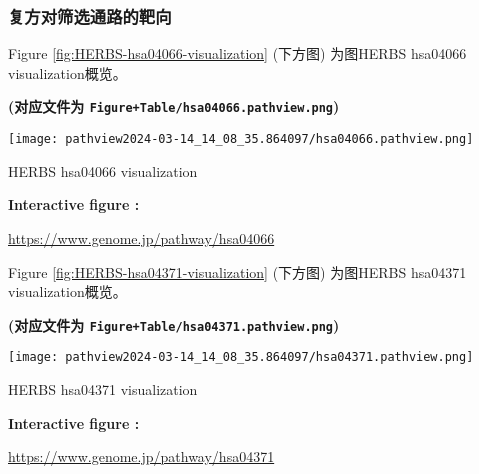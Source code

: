 \documentclass[
]{article}
\begin{document}
\hypertarget{he-t}{%
\subsubsection{复方对筛选通路的靶向}\label{he-t}}

Figure \ref{fig:HERBS-hsa04066-visualization} (下方图) 为图HERBS hsa04066 visualization概览。

\textbf{(对应文件为 \texttt{Figure+Table/hsa04066.pathview.png})}

\def\@captype{figure}
\begin{center}
\texttt{[image: pathview2024-03-14\_14\_08\_35.864097/hsa04066.pathview.png]}
\caption{HERBS hsa04066 visualization}\label{fig:HERBS-hsa04066-visualization}
\end{center}
\begin{center}\begin{tcolorbox}[colback=gray!10, colframe=gray!50, width=0.9\linewidth, arc=1mm, boxrule=0.5pt]
\textbf{
Interactive figure
:}

\vspace{0.5em}

    \url{https://www.genome.jp/pathway/hsa04066}

\vspace{2em}
\end{tcolorbox}
\end{center}

Figure \ref{fig:HERBS-hsa04371-visualization} (下方图) 为图HERBS hsa04371 visualization概览。

\textbf{(对应文件为 \texttt{Figure+Table/hsa04371.pathview.png})}

\def\@captype{figure}
\begin{center}
\texttt{[image: pathview2024-03-14\_14\_08\_35.864097/hsa04371.pathview.png]}
\caption{HERBS hsa04371 visualization}\label{fig:HERBS-hsa04371-visualization}
\end{center}
\begin{center}\begin{tcolorbox}[colback=gray!10, colframe=gray!50, width=0.9\linewidth, arc=1mm, boxrule=0.5pt]
\textbf{
Interactive figure
:}

\vspace{0.5em}

    \url{https://www.genome.jp/pathway/hsa04371}

\vspace{2em}
\end{tcolorbox}
\end{center}
\end{document}
